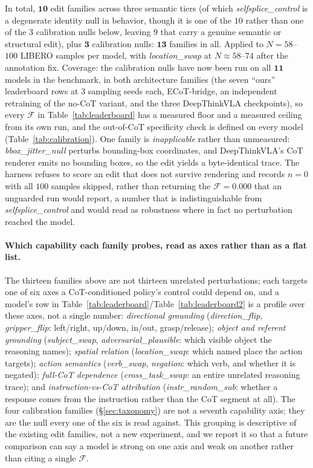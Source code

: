 In total, $\mathbf{10}$ edit families across three semantic tiers (of which \emph{selfsplice\_control} is a degenerate identity null in behavior, though it is one of the $10$ rather than one of the $3$ calibration nulls below, leaving $9$ that carry a genuine semantic or structural edit), plus $\mathbf{3}$ calibration nulls: $\mathbf{13}$ families in all. Applied to $N{=}58$--$100$ LIBERO samples per model, with \emph{location\_swap} at $N\!\approx\!58$--$74$ after the annotation fix. Coverage: the calibration nulls have now been run on all $\mathbf{11}$ models in the benchmark, in both architecture families (the seven ``ours'' leaderboard rows at 3 sampling seeds each, ECoT-bridge, an independent retraining of the no-CoT variant, and the three DeepThinkVLA checkpoints), so every $\mathcal{F}$ in Table~\ref{tab:leaderboard} has a measured floor and a measured ceiling from its own run, and the out-of-CoT specificity check is defined on every model (Table~\ref{tab:calibration}). One family is \emph{inapplicable} rather than unmeasured: \emph{bbox\_jitter\_null} perturbs bounding-box coordinates, and DeepThinkVLA's CoT renderer emits no bounding boxes, so the edit yields a byte-identical trace. The harness refuses to score an edit that does not survive rendering and records $n{=}0$ with all $100$ samples skipped, rather than returning the $\mathcal{F}=0.000$ that an unguarded run would report, a number that is indistinguishable from \emph{selfsplice\_control} and would read as robustness where in fact no perturbation reached the model.

\paragraph{Which capability each family probes, read as axes rather than as a flat list.} The thirteen families above are not thirteen unrelated perturbations; each targets one of six axes a CoT-conditioned policy's control could depend on, and a model's row in Table~\ref{tab:leaderboard}/Table~\ref{tab:leaderboard2} is a profile over these axes, not a single number: \emph{directional grounding} (\emph{direction\_flip}, \emph{gripper\_flip}: left/right, up/down, in/out, grasp/release); \emph{object and referent grounding} (\emph{subject\_swap}, \emph{adversarial\_plausible}: which visible object the reasoning names); \emph{spatial relation} (\emph{location\_swap}: which named place the action targets); \emph{action semantics} (\emph{verb\_swap}, \emph{negation}: which verb, and whether it is negated); \emph{full-CoT dependence} (\emph{cross\_task\_swap}: an entire unrelated reasoning trace); and \emph{instruction-vs-CoT attribution} (\emph{instr\_random\_sub}: whether a response comes from the instruction rather than the CoT segment at all). The four calibration families (\S\ref{sec:taxonomy}) are not a seventh capability axis; they are the null every one of the six is read against. This grouping is descriptive of the existing edit families, not a new experiment, and we report it so that a future comparison can say a model is strong on one axis and weak on another rather than citing a single $\mathcal{F}$.

